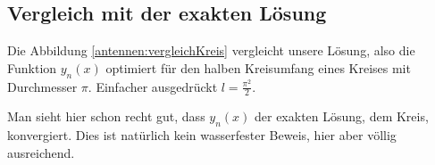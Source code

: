\subsection{Vergleich mit der exakten Lösung\label{antennen:vergleich}}

Die Abbildung \ref{antennen:vergleichKreis} vergleicht unsere Lösung\footnotemark{}, also die 
Funktion $y_n(x)$ optimiert für den halben Kreisumfang eines Kreises mit Durchmesser $\pi$. 
Einfacher ausgedrückt $l=\frac{\pi^2}{2}$.


Man sieht hier schon recht gut, dass $y_n(x)$ der
exakten Lösung, dem Kreis, konvergiert. Dies ist
natürlich kein wasserfester Beweis, hier aber völlig  
ausreichend. 















